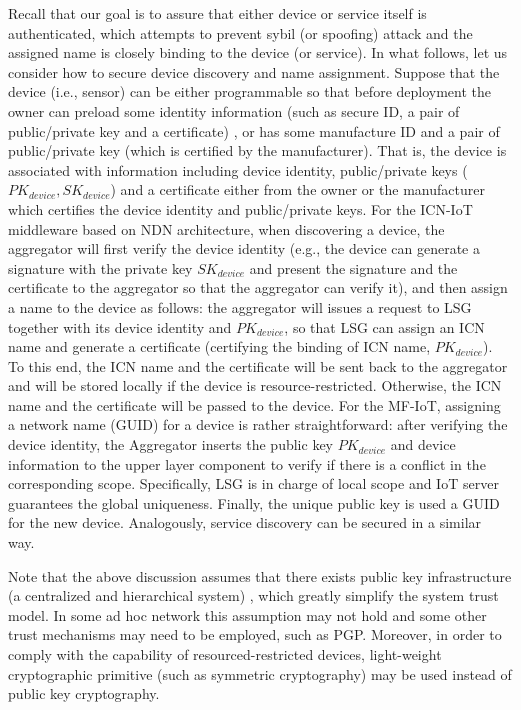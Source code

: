 Recall that our goal is to assure that either device or service itself is authenticated, which attempts to prevent sybil (or spoofing) attack \cite{sybil} and the assigned name is closely binding to the device (or service). In what follows, let us consider how to secure device discovery and name assignment. Suppose that the device (i.e., sensor) can be either programmable so that before deployment the owner can preload some identity information (such as secure ID, a pair of public/private key and a certificate) , or has some manufacture ID and a pair of public/private key (which is certified by the manufacturer). That is, the device is associated with information including device identity, public/private keys ($PK_{device}, SK_{device}$) and a certificate either from the owner or the manufacturer which certifies the device identity and public/private keys. For the ICN-IoT middleware based on NDN architecture, when discovering a device, the aggregator will first verify the device identity (e.g., the device can generate a signature with the private key $SK_{device}$ and present the signature and the certificate to the aggregator so that the aggregator can verify it), and then assign a name to the device as follows: the aggregator will issues a request to LSG together with its device identity and $PK_{device}$, so that LSG can assign an ICN name and generate a certificate (certifying the binding of ICN name, $PK_{device}$). To this end, the ICN name and the certificate will be sent back to the aggregator and will be stored locally if the device is resource-restricted. Otherwise, the ICN name and the certificate will be passed to the device. For the MF-IoT, assigning a network name (GUID) for a device is rather straightforward: after verifying the device identity, the Aggregator
inserts the public key $PK_{device}$ and device information to the upper layer component to verify if there is a conflict in the corresponding scope. Specifically, LSG is in charge of local scope and IoT server guarantees the global uniqueness. Finally, the unique public key is used a GUID for the new device. Analogously, service discovery can be secured in a similar way.
 
Note that the above discussion assumes that there exists public key infrastructure (a centralized and hierarchical system) , which greatly simplify the system trust model. In some ad hoc network this assumption may not hold and some other trust mechanisms may need to be employed, such as PGP. Moreover, in order to comply with the capability of resourced-restricted devices, light-weight cryptographic primitive (such as symmetric cryptography) may be used instead of public key cryptography.

